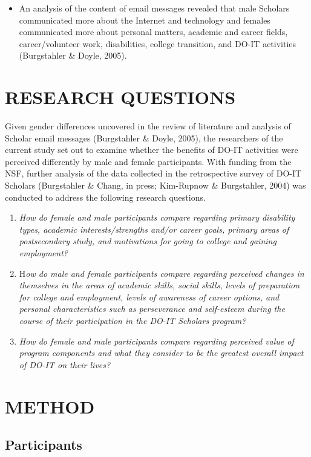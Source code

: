 \documentclass[11.5pt]{sig-alternate} %
\begin{document}
\begin{large}
\begin{itemize}
    \item 	An analysis of the content of email messages revealed that male Scholars communicated more about the Internet and technology and females communicated more about personal matters, academic and career fields, career/volunteer work, disabilities, college transition, and DO-IT activities (Burgstahler \& Doyle, 2005).
\end{itemize}
 
\section*{RESEARCH QUESTIONS}
 
Given gender differences uncovered in the review of literature and analysis of Scholar email messages (Burgstahler \& Doyle, 2005), the researchers of the current study set out to examine whether the benefits of DO-IT activities were perceived differently by male and female participants. With funding from the NSF, further analysis of the data collected in the retrospective survey of DO-IT Scholars (Burgstahler \& Chang, in press; Kim-Rupnow \& Burgstahler, 2004) was conducted to address the following research questions. 
 
\begin{enumerate}
    \item \textit{How do female and male participants compare regarding primary disability types, academic interests/strengths and/or career goals, primary areas of postsecondary study, and motivations for going to college and gaining employment?}
    \item H\textit{ow do male and female participants compare regarding perceived changes in themselves in the areas of academic skills, social skills, levels of preparation for college and employment, levels of awareness of career options, and personal characteristics such as perseverance and self-esteem during the course of their participation in the DO-IT Scholars program?}
    \item \textit{How do female and male participants compare regarding perceived value of program components and what they consider to be the greatest overall impact of DO-IT on their lives?}
\end{enumerate}
 
\section*{METHOD}
 
\subsection*{Participants}
 

\end{large}
\end{document}
